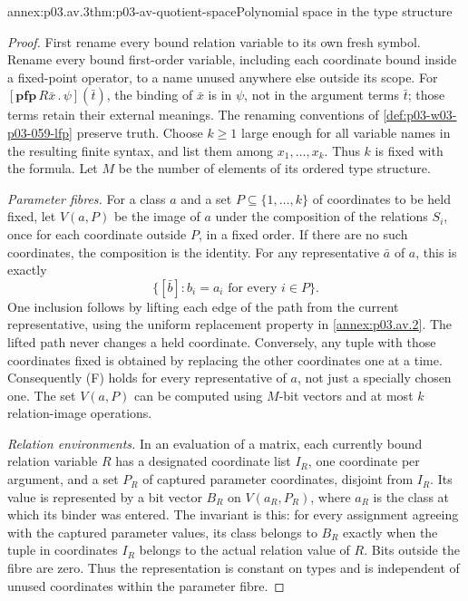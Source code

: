 \begin{annexitem}{annex:p03.av.3}{thm:p03-av-quotient-space}{Polynomial space in the type structure}
\begin{proof}
First rename every bound relation variable to its own fresh symbol.
Rename every bound first-order variable, including each coordinate
bound inside a fixed-point operator, to a name unused anywhere else
outside its scope. For
\([\mathbf{pfp}\,R\bar x\,.\,\psi](\bar t)\), the binding
of \(\bar x\) is in \(\psi\), not in the argument terms
\(\bar t\); those terms retain their external meanings. The
renaming conventions of \cref{def:p03-w03-p03-059-lfp} preserve
truth. Choose \(k\geq1\) large enough for all variable names
in the resulting finite syntax, and list them among
\(x_1,\ldots,x_k\). Thus \(k\) is fixed with the formula.
Let \(M\) be the number of elements of its ordered type structure.

\emph{Parameter fibres.} For a class \(a\) and a set
\(P\subseteq\{1,\ldots,k\}\) of coordinates to be held
fixed, let \(V(a,P)\) be the image of \(a\) under the
composition of the relations \(S_i\), once for each coordinate
outside \(P\), in a fixed order. If there are no such coordinates,
the composition is the identity. For any representative \(\bar a\)
of \(a\), this is exactly
\[
 \{[\bar b]: b_i=a_i\text{ for every }i\in P\}.
 \tag{F}
\]
One inclusion follows by lifting each edge of the path from the
current representative, using the uniform replacement property in
\cref{annex:p03.av.2}. The lifted path never changes a held
coordinate. Conversely, any tuple with those coordinates fixed is
obtained by replacing the other coordinates one at a time. Consequently
(F) holds for every representative of \(a\), not just a
specially chosen one. The set \(V(a,P)\) can be computed using
\(M\)-bit vectors and at most \(k\) relation-image operations.

\emph{Relation environments.} In an evaluation of a matrix, each
currently bound relation variable \(R\) has a designated coordinate
list \(I_R\), one coordinate per argument, and a set \(P_R\)
of captured parameter coordinates, disjoint from \(I_R\).
Its value is represented by a bit vector \(B_R\) on
\(V(a_R,P_R)\), where \(a_R\) is the class at which its
binder was entered. The invariant is this: for every assignment
agreeing with the captured parameter values, its class belongs to
\(B_R\) exactly when the tuple in coordinates \(I_R\)
belongs to the actual relation value of \(R\). Bits outside the
fibre are zero. Thus the representation is constant on types and is
independent of unused coordinates within the parameter fibre.


\end{proof}
\end{annexitem}
